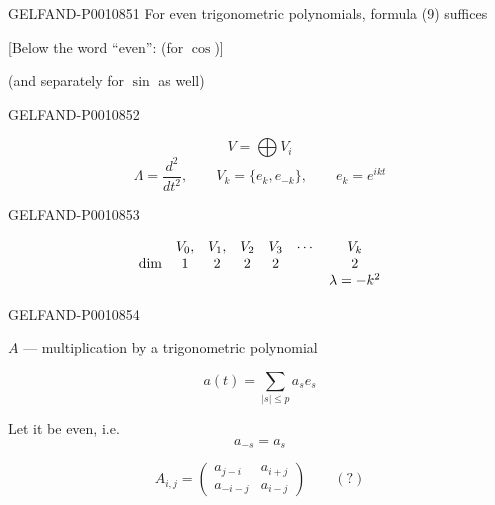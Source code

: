 \begin{GelfandAdjacentEvidence}{GELFAND-P001085}{1}
For even trigonometric polynomials, formula (9) suffices

[Below the word “even”: (for $\cos$)]

(and separately for $\sin$ as well)
\end{GelfandAdjacentEvidence}
\begin{GelfandAdjacentEvidence}{GELFAND-P001085}{2}


\[
V=\bigoplus V_i
\]
\begin{equation*}
\Lambda=\frac{d^2}{dt^2},\qquad
V_k=\{e_k,e_{-k}\},\qquad e_k=e^{ikt}
\tag{13}
\end{equation*}
\end{GelfandAdjacentEvidence}
\begin{GelfandAdjacentEvidence}{GELFAND-P001085}{3}


\[
\begin{array}{c c c c c c c}
 & V_0, & V_1, & V_2 & V_3 & \cdots & V_k\\
\dim & 1 & 2 & 2 & 2 & & 2\\
 & & & & & & \lambda=-k^2
\end{array}
\]
\end{GelfandAdjacentEvidence}
\begin{GelfandAdjacentEvidence}{GELFAND-P001085}{4}


$A$ — multiplication by a trigonometric polynomial

\begin{equation*}
a(t)=\sum_{\lvert s\rvert\le p}a_se_s
\tag{14}
\end{equation*}

Let it be even, i.e.
\begin{equation*}
a_{-s}=a_s
\tag{15}
\end{equation*}

\begin{equation*}
A_{i,j}=
\begin{pmatrix}
a_{j-i} & a_{i+j}\\
a_{-i-j} & a_{i-j}
\end{pmatrix}
\qquad (?)
\tag{16}
\end{equation*}
\end{GelfandAdjacentEvidence}
